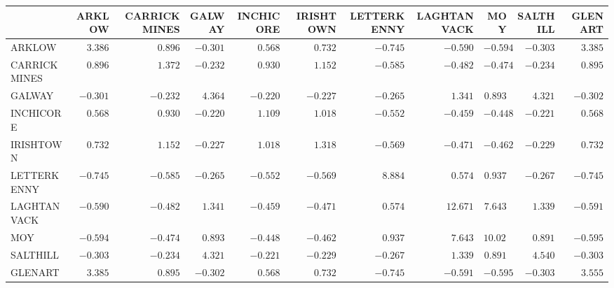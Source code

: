 \setlength{\tabcolsep}{3pt}\renewcommand{\arraystretch}{1.05}
\begin{tabular}{l|rrrrrrrrrr}
{\tiny } & {\tiny ARKLOW} & {\tiny CARRICKMINES} & {\tiny GALWAY} & {\tiny INCHICORE} & {\tiny IRISHTOWN} & {\tiny LETTERKENNY} & {\tiny LAGHTANVACK} & {\tiny MOY} & {\tiny SALTHILL} & {\tiny GLENART}\\ \hline
{\tiny ARKLOW} & $3.386$ & $0.896$ & $-0.301$ & $0.568$ & $0.732$ & $-0.745$ & $-0.590$ & $-0.594$ & $-0.303$ & $3.385$\\
{\tiny CARRICKMINES} & $0.896$ & $1.372$ & $-0.232$ & $0.930$ & $1.152$ & $-0.585$ & $-0.482$ & $-0.474$ & $-0.234$ & $0.895$\\
{\tiny GALWAY} & $-0.301$ & $-0.232$ & $4.364$ & $-0.220$ & $-0.227$ & $-0.265$ & $1.341$ & $0.893$ & $4.321$ & $-0.302$\\
{\tiny INCHICORE} & $0.568$ & $0.930$ & $-0.220$ & $1.109$ & $1.018$ & $-0.552$ & $-0.459$ & $-0.448$ & $-0.221$ & $0.568$\\
{\tiny IRISHTOWN} & $0.732$ & $1.152$ & $-0.227$ & $1.018$ & $1.318$ & $-0.569$ & $-0.471$ & $-0.462$ & $-0.229$ & $0.732$\\
{\tiny LETTERKENNY} & $-0.745$ & $-0.585$ & $-0.265$ & $-0.552$ & $-0.569$ & $8.884$ & $0.574$ & $0.937$ & $-0.267$ & $-0.745$\\
{\tiny LAGHTANVACK} & $-0.590$ & $-0.482$ & $1.341$ & $-0.459$ & $-0.471$ & $0.574$ & $12.671$ & $7.643$ & $1.339$ & $-0.591$\\
{\tiny MOY} & $-0.594$ & $-0.474$ & $0.893$ & $-0.448$ & $-0.462$ & $0.937$ & $7.643$ & $10.029$ & $0.891$ & $-0.595$\\
{\tiny SALTHILL} & $-0.303$ & $-0.234$ & $4.321$ & $-0.221$ & $-0.229$ & $-0.267$ & $1.339$ & $0.891$ & $4.540$ & $-0.303$\\
{\tiny GLENART} & $3.385$ & $0.895$ & $-0.302$ & $0.568$ & $0.732$ & $-0.745$ & $-0.591$ & $-0.595$ & $-0.303$ & $3.555$
\end{tabular}
